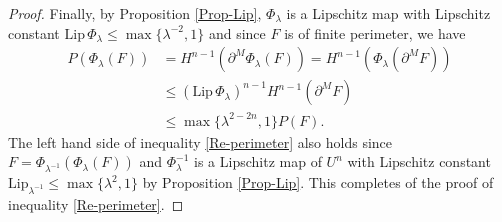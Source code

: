 \documentclass[11pt,reqno]{amsart}
\theoremstyle{definition}
\theoremstyle{remark}
\numberwithin{equation}{section}
\renewcommand{\(}{\left(}
\renewcommand{\)}{\right)}
\renewcommand{\-}{\overline}
\begin{document}
\begin{proof}
Finally, by Proposition \ref{Prop-Lip}, $\Phi_{\lambda}$ is a Lipschitz map with Lipschitz constant $\mathrm{Lip}\,\Phi_{\lambda}\leq \max\{{\lambda}^{-2},1\}$ and since $F$ is of finite perimeter, we have
\begin{align*}
	P(\Phi_{\lambda}(F))&=H^{n-1}(\partial^M \Phi_{\lambda}(F))=H^{n-1}(\Phi_{\lambda}(\partial^M F))\\
	&\leq (\mathrm{Lip}\,\Phi_{\lambda})^{n-1}H^{n-1}(\partial^M F)\\
	&\leq \max\{{\lambda}^{2-2n},1\}P(F).
\end{align*}
The left hand side of inequality \eqref{Re-perimeter} also holds since $F=\Phi_{{\lambda}^{-1}}(\Phi_{\lambda}(F))$ and $\Phi_{\lambda}^{-1}$ is a Lipschitz map of $U^n$ with Lipschitz constant $\mathrm{Lip}_{\lambda^{-1}}\leq \max\{\lambda^2,1\}$ by Proposition \ref{Prop-Lip}. This completes of the proof of inequality \eqref{Re-perimeter}.
\end{proof}
\end{document}
